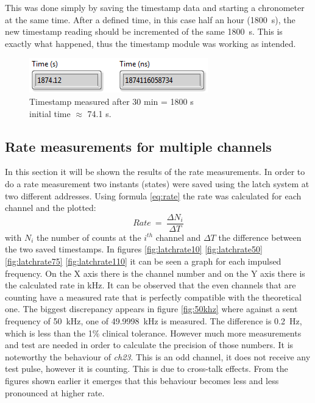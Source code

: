 This was done simply by saving the timestamp data and starting a chronometer at the same time. After a defined time, in this case half an hour (1800~s), the new timestamp reading should be incremented of the same 1800~s.
This is exactly what happened, thus the timestamp module was working as intended.  
\begin{figure}[H]
	\centering
	\includegraphics[width=0.35\linewidth]{IMG/ch5/latch_tests/fig20.PNG}
	\caption{Timestamp measured after 30 min = 1800 s\\initial time $\approx$ 74.1 s.}
	\label{fig:timestamptest}
\end{figure}

\subsection{Rate measurements for multiple channels}\label{RateMeasurements}
\noindent In this section it will be shown the results of the rate measurements. In order to do a rate measurement two instants (states) were saved using the latch system at two different addresses. Using formula \ref{eq:rate} the rate was calculated for each channel and the plotted:
\begin{equation}\label{eq:rate}
	Rate\:=\: \frac{\Delta N_i}{\Delta T}
\end{equation}
\noindent with $N_i$ the number of counts at the $i^{th}$ channel and $\Delta T$ the difference between the two saved timestamps.
In figures \ref{fig:latchrate10} \ref{fig:latchrate50} \ref{fig:latchrate75} \ref{fig:latchrate110} it can be seen a graph for each impulsed frequency. On the X axis there is the channel number and on the Y axis there is the calculated rate in kHz. It can be observed that the even channels that are counting have a measured rate that is perfectly compatible with the theoretical one.
The biggest discrepancy appears in figure \ref{fig:50khz} where against a sent frequency of 50~kHz, one of 49.9998~kHz is measured. The difference is 0.2~Hz, which is less than the 1\% clinical tolerance. However much more measurements and test are needed in order to calculate the precision of those numbers.
It is noteworthy the behaviour of \textit{ch23}. This is an odd channel, it does not receive any test pulse, however it is counting. This is due to cross-talk effects.
From the figures shown earlier it emerges that this behaviour becomes less and less pronounced at higher rate.
